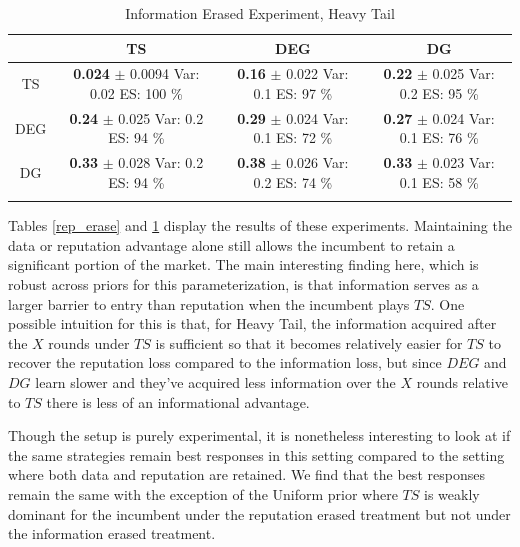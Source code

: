\documentclass{article}
\theoremstyle{definition}
\begin{document}
\begin{table}[ht]
\centering
\caption{Information Erased Experiment, Heavy Tail}
\begin{tabular}{c@{\hspace{1.0\tabcolsep}}ccc}
  \hline
 & TS & DEG &  DG \\
  \hline
TS & \makecell{\textbf{ 0.024 } $\pm$ 0.0094 \\Var: 0.02 \\ ES: 100 \%} & \makecell{\textbf{ 0.16 } $\pm$ 0.022 \\Var: 0.1 \\ ES: 97 \%} & \makecell{\textbf{ 0.22 } $\pm$ 0.025 \\Var: 0.2 \\ ES: 95 \%} \\
  DEG & \makecell{\textbf{ 0.24 } $\pm$ 0.025 \\Var: 0.2 \\ ES: 94 \%} & \makecell{\textbf{ 0.29 } $\pm$ 0.024 \\Var: 0.1 \\ ES: 72 \%} & \makecell{\textbf{ 0.27 } $\pm$ 0.024 \\Var: 0.1 \\ ES: 76 \%} \\
   DG & \makecell{\textbf{ 0.33 } $\pm$ 0.028 \\Var: 0.2 \\ ES: 94 \%} & \makecell{\textbf{ 0.38 } $\pm$ 0.026 \\Var: 0.2 \\ ES: 74 \%} & \makecell{\textbf{ 0.33 } $\pm$ 0.023 \\Var: 0.1 \\ ES: 58 \%} \\
   \hline
   \label{info_erase}
\end{tabular}
\end{table}

Tables \ref{rep_erase} and \ref{info_erase} display the results of these experiments. Maintaining the data or reputation advantage alone still allows the incumbent to retain a significant portion of the market. The main interesting finding here, which is robust across priors for this parameterization, is that information serves as a larger barrier to entry than reputation when the incumbent plays $TS$. One possible intuition for this is that, for Heavy Tail, the information acquired after the $X$ rounds under $TS$ is sufficient so that it becomes relatively easier for $TS$ to recover the reputation loss compared to the information loss, but since $DEG$ and $DG$ learn slower and they've acquired less information over the $X$ rounds relative to $TS$ there is less of an informational advantage.

Though the setup is purely experimental, it is nonetheless interesting to look at if the same strategies remain best responses in this setting compared to the setting where both data and reputation are retained. We find that the best responses remain the same with the exception of the Uniform prior where $TS$ is weakly dominant for the incumbent under the reputation erased treatment but not under the information erased treatment.


\end{document}

